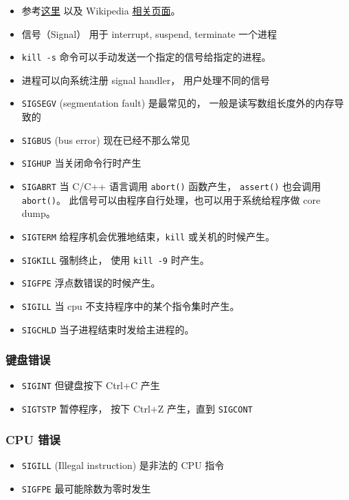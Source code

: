 
\begin{issues}
\issueDraft
\end{issues}

\begin{itemize}
\item 参考\href{https://unix.stackexchange.com/questions/6332/what-causes-various-signals-to-be-sent}{这里} 以及 Wikipedia \href{https://en.wikipedia.org/wiki/Signal_(IPC)}{相关页面}。
\item 信号（Signal） 用于 interrupt, suspend, terminate 一个进程
\item \verb`kill -s` 命令可以手动发送一个指定的信号给指定的进程。
\item 进程可以向系统注册 signal handler， 用户处理不同的信号
\item \verb`SIGSEGV` (segmentation fault) 是最常见的， 一般是读写数组长度外的内存导致的
\item \verb`SIGBUS` (bus error) 现在已经不那么常见
\item \verb`SIGHUP` 当关闭命令行时产生
\item \verb`SIGABRT` 当 C/C++ 语言调用 \verb`abort()` 函数产生， \verb`assert()` 也会调用 \verb`abort()`。 此信号可以由程序自行处理，也可以用于系统给程序做 core dump。
\item \verb`SIGTERM` 给程序机会优雅地结束，\verb`kill` 或关机的时候产生。
\item \verb`SIGKILL` 强制终止， 使用 \verb`kill -9` 时产生。
\item \verb`SIGFPE` 浮点数错误的时候产生。
\item \verb`SIGILL` 当 cpu 不支持程序中的某个指令集时产生。
\item \verb`SIGCHLD` 当子进程结束时发给主进程的。
\end{itemize}

\subsubsection{键盘错误}
\begin{itemize}
\item \verb`SIGINT` 但键盘按下 Ctrl+C 产生
\item \verb`SIGTSTP` 暂停程序， 按下 Ctrl+Z 产生，直到 \verb`SIGCONT`
\end{itemize}

\subsubsection{CPU 错误}
\begin{itemize}
\item \verb`SIGILL` (Illegal instruction) 是非法的 CPU 指令
\item \verb`SIGFPE` 最可能除数为零时发生
\end{itemize}
